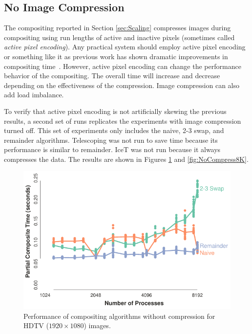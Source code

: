 \documentclass{vgtc}                          %
\newcommand*{\lcite}[1]{~\cite{#1}}
\newcommand*{\keyterm}[1]{\emph{#1}}
\newcommand{\textalgorithm}[1]{\textsf{#1}\xspace}
\newcommand{\ttswap}{\textalgorithm{2-3 swap}}
\newcommand{\naive}{\textalgorithm{naive}}
\newcommand{\Telescoping}{\textalgorithm{Telescoping}}
\newcommand{\remainder}{\textalgorithm{remainder}}
\begin{document}
\subsection{No Image Compression}
\label{sec:FullImages}

The compositing reported in Section \ref{sec:Scaling} compresses images during compositing using run lengths of active and inactive pixels (sometimes called \keyterm{active pixel encoding}).
Any practical system should employ active pixel encoding or something like it as previous work has shown dramatic improvements in compositing time\lcite{Ahrens1998,Moreland2001}.
However, active pixel encoding can change the performance behavior of the compositing.
The overall time will increase and decrease depending on the effectiveness of the compression.
Image compression can also add load imbalance.

To verify that active pixel encoding is not artificially skewing the previous results, a second set of runs replicates the experiments with image compression turned off.
This set of experiments only includes the \naive, \ttswap, and \remainder algorithms.
\Telescoping was not run to save time because its performance is similar to \remainder.
IceT was not run because it always compresses the data.
The results are shown in Figures \ref{fig:NoCompressHDTV} and \ref{fig:NoCompress8K}.

\begin{figure}
  \centering
  \includegraphics[width=\linewidth]{no-compress-hdtv}
  \caption{
    Performance of compositing algorithms without compression for HDTV ($1920 \times 1080$) images.
  }
  \label{fig:NoCompressHDTV}
\end{figure}
\end{document}
